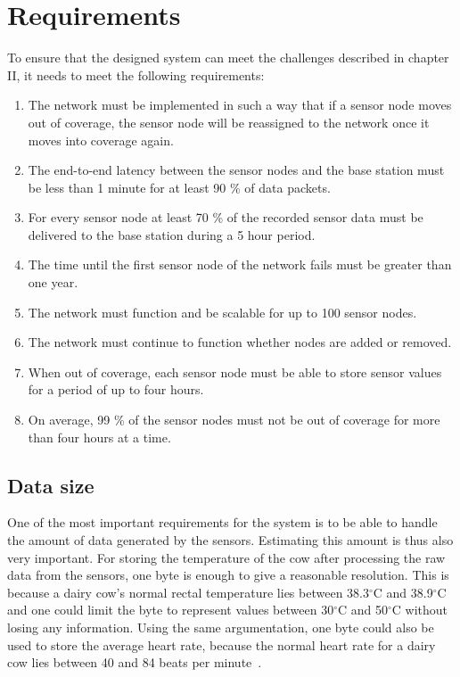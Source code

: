\documentclass[conference]{IEEEtran}
\begin{document}
\section{Requirements}

To ensure that the designed system can meet the challenges described in chapter II, it
needs to meet the following requirements:

\begin{enumerate} 

    \item The network must be implemented in such a way that if a sensor node
        moves out of coverage, the sensor node will be reassigned to the
        network once it moves into coverage again.  
        
    \item The end-to-end latency between the sensor nodes and the base station
        must be less than 1 minute for at least 90 \% of data packets.
        
    \item For every sensor node at least 70 \% of the recorded sensor data must
        be delivered to the base station during a 5 hour period.
        
    \item The time until the first sensor node of the network fails must be
        greater than one year.  
        
    \item The network must function and be scalable for up to 100 sensor nodes.
        
    \item The network must continue to function whether nodes are added or
        removed.
    
    \item When out of coverage, each sensor node must be able to store sensor
        values for a period of up to four hours.
    
    \item  On average, 99 \% of the sensor nodes must not be out of coverage
        for more than four hours at a time.

\end{enumerate}


\subsection{Data size}

One of the most important requirements for the system is to be able to handle
the amount of data generated by the sensors. Estimating this amount is thus
also very important. For storing the temperature of the cow after processing
the raw data from the sensors, one byte is enough to give a reasonable
resolution. This is because a dairy cow’s normal rectal temperature lies
between 38.3$^\circ$C and 38.9$^\circ$C~\cite{wikibov} and one could limit the
byte to represent values between 30$^\circ$C and 50$^\circ$C without losing any
information.  Using the same argumentation, one byte could also be used to
store the average heart rate, because the normal heart rate for a dairy cow
lies between 40 and 84 beats per minute~\cite{wikibov}.
\end{document}
